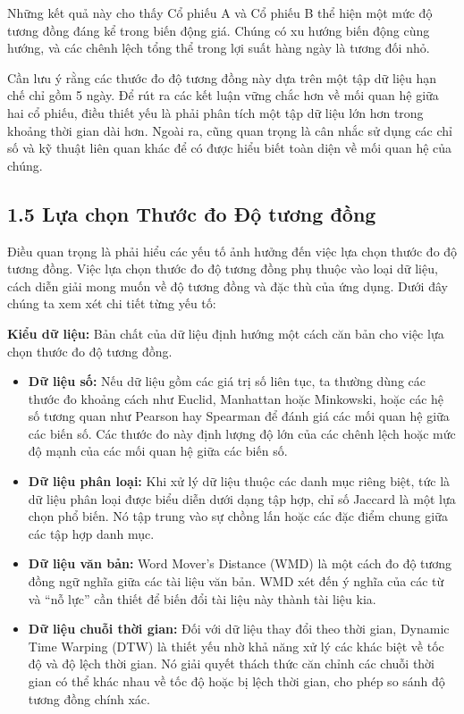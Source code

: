 Những kết quả này cho thấy Cổ phiếu A và Cổ phiếu B thể hiện một mức độ tương đồng đáng kể trong biến động giá. Chúng có xu hướng biến động cùng hướng, và các chênh lệch tổng thể trong lợi suất hàng ngày là tương đối nhỏ.

Cần lưu ý rằng các thước đo độ tương đồng này dựa trên một tập dữ liệu hạn chế chỉ gồm 5 ngày. Để rút ra các kết luận vững chắc hơn về mối quan hệ giữa hai cổ phiếu, điều thiết yếu là phải phân tích một tập dữ liệu lớn hơn trong khoảng thời gian dài hơn. Ngoài ra, cũng quan trọng là cân nhắc sử dụng các chỉ số và kỹ thuật liên quan khác để có được hiểu biết toàn diện về mối quan hệ của chúng.

\subsection{1.5 Lựa chọn Thước đo Độ tương đồng}

Điều quan trọng là phải hiểu các yếu tố ảnh hưởng đến việc lựa chọn thước đo độ tương đồng. Việc lựa chọn thước đo độ tương đồng phụ thuộc vào loại dữ liệu, cách diễn giải mong muốn về độ tương đồng và đặc thù của ứng dụng. Dưới đây chúng ta xem xét chi tiết từng yếu tố:

\textbf{Kiểu dữ liệu:} Bản chất của dữ liệu định hướng một cách căn bản cho việc lựa chọn thước đo độ tương đồng.

\begin{itemize}
  \item \textbf{Dữ liệu số:} Nếu dữ liệu gồm các giá trị số liên tục, ta thường dùng các thước đo khoảng cách như Euclid, Manhattan hoặc Minkowski, hoặc các hệ số tương quan như Pearson hay Spearman để đánh giá các mối quan hệ giữa các biến số. Các thước đo này định lượng độ lớn của các chênh lệch hoặc mức độ mạnh của các mối quan hệ giữa các biến số.
  \item \textbf{Dữ liệu phân loại:} Khi xử lý dữ liệu thuộc các danh mục riêng biệt, tức là dữ liệu phân loại được biểu diễn dưới dạng tập hợp, chỉ số Jaccard là một lựa chọn phổ biến. Nó tập trung vào sự chồng lấn hoặc các đặc điểm chung giữa các tập hợp danh mục.
  \item \textbf{Dữ liệu văn bản:} Word Mover's Distance (WMD) là một cách đo độ tương đồng ngữ nghĩa giữa các tài liệu văn bản. WMD xét đến ý nghĩa của các từ và ``nỗ lực'' cần thiết để biến đổi tài liệu này thành tài liệu kia.
  \item \textbf{Dữ liệu chuỗi thời gian:} Đối với dữ liệu thay đổi theo thời gian, Dynamic Time Warping (DTW) là thiết yếu nhờ khả năng xử lý các khác biệt về tốc độ và độ lệch thời gian. Nó giải quyết thách thức căn chỉnh các chuỗi thời gian có thể khác nhau về tốc độ hoặc bị lệch thời gian, cho phép so sánh độ tương đồng chính xác.
\end{itemize}

